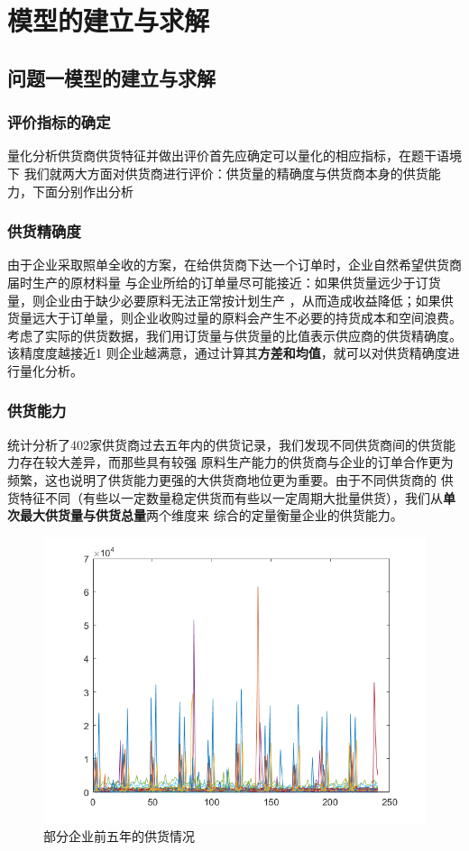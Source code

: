 \documentclass[withoutpreface,bwprint]{cumcmthesis}
\begin{document}
\section{模型的建立与求解}
\subsection{问题一模型的建立与求解}

\subsubsection{评价指标的确定}
量化分析供货商供货特征并做出评价首先应确定可以量化的相应指标，在题干语境下
我们就两大方面对供货商进行评价：供货量的精确度与供货商本身的供货能力，下面分别作出分析
\subsubsection*{供货精确度}
由于企业采取照单全收的方案，在给供货商下达一个订单时，企业自然希望供货商届时生产的原材料量
与企业所给的订单量尽可能接近：如果供货量远少于订货量，则企业由于缺少必要原料无法正常按计划生产
，从而造成收益降低；如果供货量远大于订单量，则企业收购过量的原料会产生不必要的持货成本和空间浪费。考虑了实际的供货数据，我们用订货量与供货量的比值表示供应商的供货精确度。该精度度越接近1
则企业越满意，通过计算其\textbf{方差和均值}，就可以对供货精确度进行量化分析。

\subsubsection*{供货能力}
统计分析了402家供货商过去五年内的供货记录，我们发现不同供货商间的供货能力存在较大差异，而那些具有较强
原料生产能力的供货商与企业的订单合作更为频繁，这也说明了供货能力更强的大供货商地位更为重要。由于不同供货商的
供货特征不同（有些以一定数量稳定供货而有些以一定周期大批量供货），我们从\textbf{单次最大供货量与供货总量}两个维度来
综合的定量衡量企业的供货能力。\par
\begin{figure}[htbp]
    \centering
    \includegraphics[scale=0.6]{offer.png}
    \caption{部分企业前五年的供货情况}     \label{fig:1}
\end{figure}
\end{document}
